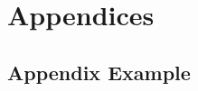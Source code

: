 \documentclass[a4paper]{article}
\begin{document}
\section{Appendices}

\newpage
\subsection{Appendix Example}




\newpage
\printbibliography
\end{document}
